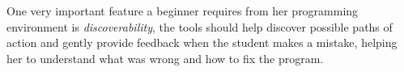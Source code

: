 One very important feature a beginner requires from her programming environment is \emph{discoverability}, 
\ie the tools should help discover possible paths of action and gently provide feedback when the student makes a mistake, 
helping her to understand what was wrong and how to fix the program.

